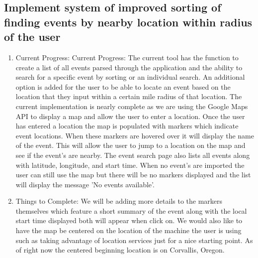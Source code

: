 \documentclass[letterpaper,10pt,onecolumn]{IEEEtran} %
\begin{document}
\subsection{Implement system of improved sorting of finding events by nearby location within radius of the user}
\begin{enumerate}[label*=\arabic*.]
\item Current Progress: Current Progress: The current tool has the function to create a list of all events parsed through the application and the ability to search for a specific event by sorting or an individual search. An additional option is added for the user to be able to locate an event based on the location that they input within a certain mile radius of that location. The current implementation is nearly complete as we are using the Google Maps API to display a map and allow the user to enter a location. Once the user has entered a location the map is populated with markers which indicate event locations. When these markers are hovered over it will display the name of the event. This will allow the user to jump to a location on the map and see if the event's are nearby. The event search page also lists all events along with latitude, longitude, and start time. When no event's are imported the user can still use the map but there will be no markers displayed and the list will display the message 'No events available'.


\item Things to Complete: We will be adding more details to the markers themselves which feature a short summary of the event along with the local start time displayed both will appear when click on. We would also like to have the map be centered on the location of the machine the user is using such as taking advantage of location services just for a nice starting point. As of right now the centered beginning location is on Corvallis, Oregon.


\end{enumerate}
\end{document}

